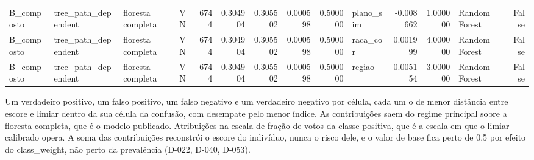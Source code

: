 \begin{tabular}{llllrrrrrlrrlr}
B_composto & tree_path_dependent & floresta completa & VN & 6744 & 0.304904 & 0.305502 & 0.000598 & 0.500000 & plano_sim & -0.008662 & 1.000000 & Random Forest & False \\
B_composto & tree_path_dependent & floresta completa & VN & 6744 & 0.304904 & 0.305502 & 0.000598 & 0.500000 & raca_cor & 0.001999 & 4.000000 & Random Forest & False \\
B_composto & tree_path_dependent & floresta completa & VN & 6744 & 0.304904 & 0.305502 & 0.000598 & 0.500000 & regiao & 0.005154 & 3.000000 & Random Forest & False \\
\bottomrule
\end{tabular}

\begin{flushleft}
\footnotesize Um verdadeiro positivo, um falso positivo, um falso negativo e um verdadeiro negativo por célula, cada um o de menor distância entre escore e limiar dentro da sua célula da confusão, com desempate pelo menor índice. As contribuições saem do regime principal sobre a floresta completa, que é o modelo publicado. Atribuições na escala de fração de votos da classe positiva, que é a escala em que o limiar calibrado opera. A soma das contribuições reconstrói o escore do indivíduo, nunca o risco dele, e o valor de base fica perto de 0,5 por efeito do class\_weight, não perto da prevalência (D-022, D-040, D-053).
\end{flushleft}

